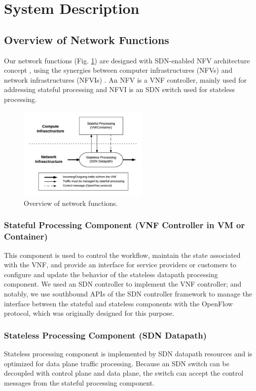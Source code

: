 \documentclass[10pt,journal]{IEEEtran}
\begin{document}
\section{System Description}
\subsection{Overview of Network Functions} \label{ssec:desc_nfv_overview}
Our network functions (Fig. \ref{fig:desc_nfv_overview}) are designed with SDN-enabled NFV architecture concept \cite{sdn-enabled}, using the synergies between computer infrastructures (NFVs) and network infrastructures (NFVIs) \cite{nfv2014-v121, nfv2015}.
An NFV is a VNF controller, mainly used for addressing stateful processing and NFVI is an SDN switch used for stateless processing.

\begin{figure}[!t]
\centering
\includegraphics[width=2.5in]{./figures/desc_nfv_overview}
\caption{Overview of network functions.}
\label{fig:desc_nfv_overview}
\end{figure}

\subsubsection{Stateful Processing Component (VNF Controller in VM or Container)}
This component is used to control the workflow, maintain the state associated with the VNF, and provide an interface for service providers or customers to configure and update the behavior of the stateless datapath processing component. We used an SDN controller to implement the VNF controller; and notably, we use southbound APIs of the SDN controller framework to manage the interface between the stateful and stateless components with the OpenFlow protocol, which was originally designed for this purpose.

\subsubsection{Stateless Processing Component (SDN Datapath)}
Stateless processing component is implemented by SDN datapath resources and is optimized for data plane traffic processing. Because an SDN switch can be decoupled with control plane and data plane, the switch can accept the control messages from the stateful processing component.
\end{document}
